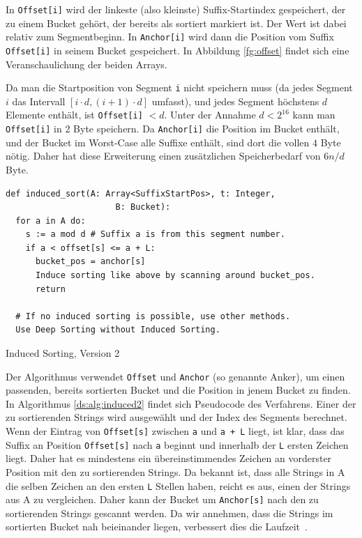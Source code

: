 In \texttt{Offset[i]} wird der linkeste (also kleinste) Suffix-Startindex gespeichert, der zu einem Bucket gehört, der bereits als sortiert markiert ist.
Der Wert ist dabei relativ zum Segmentbeginn.
In \texttt{Anchor[i]} wird dann die Position vom Suffix \texttt{Offset[i]} in seinem Bucket gespeichert.
In Abbildung \ref{fg:offset} findet sich eine Veranschaulichung der beiden Arrays.

Da man die Startposition von Segment \texttt{i} nicht speichern muss (da jedes Segment $i$ das Intervall $[i\cdot d, (i + 1) \cdot d]$ umfasst), und jedes Segment höchstens $d$ Elemente enthält, ist \texttt{Offset[i]} $< d$.
Unter der Annahme $d < 2^{16}$ kann man \texttt{Offset[i]} in 2 Byte speichern.
Da \texttt{Anchor[i]} die Position im Bucket enthält, und der Bucket im Worst-Case alle Suffixe enthält, sind dort die vollen $4$ Byte nötig.
Daher hat diese Erweiterung einen zusätzlichen Speicherbedarf von $6n/d$ Byte.

\begin{listing}
\begin{verbatim}
def induced_sort(A: Array<SuffixStartPos>, t: Integer,
                      B: Bucket):
  for a in A do:
    s := a mod d # Suffix a is from this segment number.
    if a < offset[s] <= a + L:
      bucket_pos = anchor[s]
      Induce sorting like above by scanning around bucket_pos.
      return

  # If no induced sorting is possible, use other methods.
  Use Deep Sorting without Induced Sorting.
\end{verbatim}
\caption{Induced Sorting, Version 2~\cite{saca:4}}
\label{ds:alg:induced2}
\end{listing}

Der Algorithmus verwendet \texttt{Offset} und \texttt{Anchor} (so genannte Anker), um einen passenden, bereits sortierten Bucket und die Position in jenem Bucket zu finden.
In Algorithmus \ref{ds:alg:induced2} findet sich Pseudocode des Verfahrens.
Einer der zu sortierenden Strings wird ausgewählt und der Index des Segments berechnet.
Wenn der Eintrag von \texttt{Offset[s]} zwischen \texttt{a} und \texttt{a + L} liegt, ist klar, dass das Suffix an Position \texttt{Offset[s]} nach \texttt{a} beginnt und innerhalb der \texttt L ersten Zeichen liegt.
Daher hat es mindestens ein übereinstimmendes Zeichen an vorderster Position mit den zu sortierenden Strings.
Da bekannt ist, dass alle Strings in A die selben Zeichen an den ersten \texttt{L} Stellen haben, reicht es aus, einen der Strings aus A zu vergleichen.
Daher kann der Bucket um \texttt{Anchor[s]} nach den zu sortierenden Strings gescannt werden.
Da wir annehmen, dass die Strings im sortierten Bucket nah beieinander liegen, verbessert dies die Laufzeit~\cite{saca:4}.

